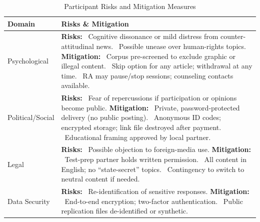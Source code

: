 \documentclass[12pt, american]{article}
\begin{document}
\begin{table}[H]
\centering
\caption{Participant Risks and Mitigation Measures}
\label{tab:risks}
\setlength{\tabcolsep}{4pt}     %
\renewcommand{\arraystretch}{1.15}
\newcommand{\tabitem}{\textbullet\ }   %

\begin{tabularx}{\linewidth}{@{}p{2.8cm}X@{}}
\toprule
\textbf{Domain} &
\textbf{Risks \& Mitigation} \\
\midrule
Psychological &
\textbf{Risks:}\newline
\tabitem Cognitive dissonance or mild distress from counter-attitudinal news.\newline
\tabitem Possible unease over human-rights topics.\newline
\textbf{Mitigation:}\newline
\tabitem Corpus pre-screened to exclude graphic or illegal content.\newline
\tabitem Skip option for any article; withdrawal at any time.\newline
\tabitem RA may pause/stop sessions; counseling contacts available.\\

Political/Social &
\textbf{Risks:}\newline
\tabitem Fear of repercussions if participation or opinions become public.\newline
\textbf{Mitigation:}\newline
\tabitem Private, password-protected delivery (no public posting).\newline
\tabitem Anonymous ID codes; encrypted storage; link file destroyed after payment.\newline
\tabitem Educational framing approved by local partner.\\

Legal &
\textbf{Risks:}\newline
\tabitem Possible objection to foreign-media use.\newline
\textbf{Mitigation:}\newline
\tabitem Test-prep partner holds written permission.\newline
\tabitem All content in English; no “state-secret” topics.\newline
\tabitem Contingency to switch to neutral content if needed.\\[6pt]

Data Security &
\textbf{Risks:}\newline
\tabitem Re-identification of sensitive responses.\newline
\textbf{Mitigation:}\newline
\tabitem End-to-end encryption; two-factor authentication.\newline
\tabitem Public replication files de-identified or synthetic.\\
\bottomrule
\end{tabularx}
\end{table}
\end{document}
